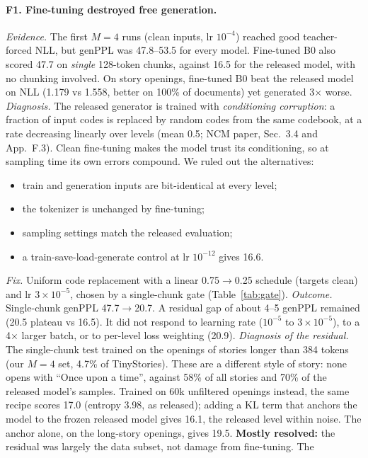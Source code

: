 \paragraph{F1. Fine-tuning destroyed free generation.}
\emph{Evidence.} The first $M{=}4$ runs (clean inputs, lr $10^{-4}$) reached good teacher-forced NLL, but
genPPL was 47.8--53.5 for every model. Fine-tuned B0 also scored 47.7 on \emph{single} 128-token chunks, against
16.5 for the released model, with no chunking involved. On story openings, fine-tuned B0 beat the released
model on NLL (1.179 vs 1.558, better on 100\% of documents) yet generated 3$\times$ worse.
\emph{Diagnosis.} The released generator is trained with \emph{conditioning corruption}: a fraction of input
codes is replaced by random codes from the same codebook, at a rate decreasing linearly over levels (mean 0.5;
NCM paper, Sec.~3.4 and App.~F.3). Clean fine-tuning makes the model trust its conditioning, so at sampling time
its own errors compound. We ruled out the alternatives:
\begin{itemize}[nosep]
  \item train and generation inputs are bit-identical at every level;
  \item the tokenizer is unchanged by fine-tuning;
  \item sampling settings match the released evaluation;
  \item a train-save-load-generate control at lr $10^{-12}$ gives 16.6.
\end{itemize}
\emph{Fix.} Uniform code replacement with a linear 0.75$\to$0.25 schedule (targets clean) and lr
$3{\times}10^{-5}$, chosen by a single-chunk gate (Table~\ref{tab:gate}).
\emph{Outcome.} Single-chunk genPPL 47.7$\to$20.7. A residual gap of about 4--5 genPPL remained (20.5 plateau vs
16.5). It did not respond to learning rate ($10^{-5}$ to $3{\times}10^{-5}$), to a 4$\times$ larger batch, or to
per-level loss weighting (20.9).
\emph{Diagnosis of the residual.} The single-chunk test trained on the openings of stories longer than 384 tokens
(our $M{=}4$ set, 4.7\% of TinyStories). These are a different style of story: none opens with ``Once upon a
time'', against 58\% of all stories and 70\% of the released model's samples. Trained on 60k unfiltered openings
instead, the same recipe scores 17.0 (entropy 3.98, as released); adding a KL term that anchors the model to the
frozen released model gives 16.1, the released level within noise. The anchor alone, on the long-story openings,
gives 19.5. \textbf{Mostly resolved:} the residual was largely the data subset, not damage from fine-tuning. The
